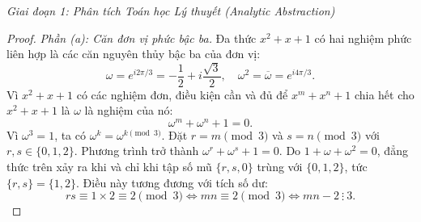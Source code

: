 \documentclass{article}
\begin{document}
\vspace{0.5em}\noindent\emph{Giai đoạn 1: Phân tích Toán học Lý thuyết (Analytic Abstraction)}

\begin{proof}
\emph{Phần (a): Căn đơn vị phức bậc ba.}
Đa thức $x^2 + x + 1$ có hai nghiệm phức liên hợp là các căn nguyên thủy bậc ba của đơn vị:
\begin{equation}
    \omega = e^{i 2\pi/3} = -\frac{1}{2} + i\frac{\sqrt{3}}{2}, \quad \omega^2 = \overline{\omega} = e^{i 4\pi/3}.
\end{equation}
Vì $x^2 + x + 1$ có các nghiệm đơn, điều kiện cần và đủ để $x^m + x^n + 1$ chia hết cho $x^2 + x + 1$ là $\omega$ là nghiệm của nó:
\begin{equation}
    \omega^m + \omega^n + 1 = 0.
\end{equation}
Vì $\omega^3 = 1$, ta có $\omega^k = \omega^{k \pmod 3}$. Đặt $r = m \pmod 3$ và $s = n \pmod 3$ với $r, s \in \{0, 1, 2\}$.
Phương trình trở thành $\omega^r + \omega^s + 1 = 0$.
Do $1 + \omega + \omega^2 = 0$, đẳng thức trên xảy ra khi và chỉ khi tập số mũ $\{r, s, 0\}$ trùng với $\{0, 1, 2\}$, tức $\{r, s\} = \{1, 2\}$.
Điều này tương đương với tích số dư:
\begin{equation}
    rs \equiv 1 \times 2 \equiv 2 \pmod 3 \iff mn \equiv 2 \pmod 3 \iff mn - 2 \ \vdots \ 3.
\end{equation}


\end{proof}
\end{document}
